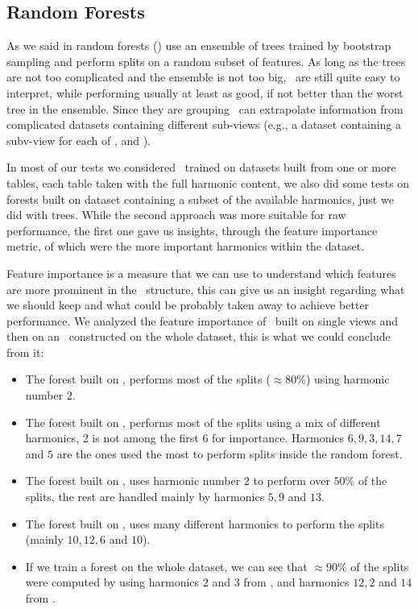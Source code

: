 \subsection{Random Forests}
\label{sec:qrp-rf}
As we said in  random forests (\rfs) use an ensemble of trees trained by bootstrap
sampling and perform splits on a random subset of features. As long as the trees are not too
complicated and the ensemble is not too big, \rfs\ are still quite easy to interpret, while
performing usually at least as good, if not better than the worst tree in the ensemble. Since they
are grouping \rfs\ can extrapolate information from complicated datasets containing different
sub-views (e.g., a dataset containing a subv-view for each of \an, \bn and \cnmod).

In most of our tests we considered \rfs\ trained on datasets built from one or more tables, each
table taken with the full harmonic content, we also did some tests on forests built on dataset
containing a subset of the available harmonics, just we did with trees. While the second approach
was more suitable for raw performance, the first one gave us insights, through the feature
importance metric, of which were the more important harmonics within the dataset.

Feature importance is a measure that we can use to understand which features are more prominent in
the \rf\ structure, this can give us an insight regarding what we should keep and what could be
probably taken away to achieve better performance. We analyzed the feature importance of \rfs\ built
on single views and then on an \rf\ constructed on the whole dataset, this is what we could conclude
from it:
\begin{itemize}
	\item The forest built on \an, performs most of the splits ($\approx 80\%$) using harmonic
	      number $2$.
	\item The forest built on \bn, performs most of the splits using a mix of different
	      harmonics, $2$ is not among the first $6$ for importance. Harmonics
	      $6, 9, 3, 14, 7$ and $5$ are the ones used the most to perform splits inside the
	      random forest.
	\item The forest built on \cnmod, uses harmonic number $2$ to perform over $50\%$ of the
	      splits, the rest are handled mainly by harmonics $5, 9$ and $13$.
	\item The forest built on \phin, uses many different harmonics to perform the splits (mainly
	      $10, 12, 6$ and $10$).
	\item If we train a forest on the whole dataset, we can see that $\approx90\%$ of the splits were computed by using harmonics $2$ and $3$ from \cnmod, and harmonics $12, 2$ and $14$ from \an.
\end{itemize}


